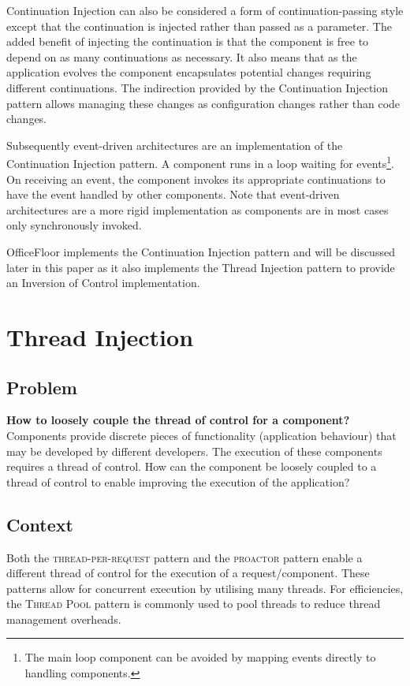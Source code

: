 \documentclass[prodmode]{style/acmlarge}
\begin{document}
Continuation Injection can also be considered a form of continuation-passing
style \cite{continuations} except that the continuation is injected rather than
passed as a parameter.  The added benefit of injecting the continuation is that
the component is free to depend on as many continuations as necessary.  It also
means that as the application evolves the component encapsulates potential
changes requiring different continuations.  The indirection provided by the
Continuation Injection pattern allows managing these changes as configuration
changes rather than code changes.

Subsequently event-driven architectures are an implementation of the
Continuation Injection pattern.  A component runs in a loop waiting for
events\footnote{The main loop component can be avoided by mapping events
directly to handling components.}.  On receiving an event, the component invokes
its appropriate continuations to have the event handled by other components. 
Note that event-driven architectures are a more rigid implementation as
components are in most cases only synchronously invoked.

OfficeFloor \cite{officefloor} implements the Continuation Injection pattern and
will be discussed later in this paper as it also implements the Thread Injection
pattern to provide an Inversion of Control implementation.



\section{Thread Injection}


\subsection{Problem}

\textbf{How to loosely couple the thread of control for a component?} 
Components provide discrete pieces of functionality (application behaviour) that
may be developed by different developers.  The execution of these components
requires a thread of control.  How can the component be loosely coupled to a
thread of control to enable improving the execution of the application?


\subsection{Context}

Both the \textsc{thread-per-request} pattern \cite{thread-per-request} and the
\textsc{proactor} pattern \cite{proactor} enable a different thread of control
for the execution of a request/component.  These patterns allow for concurrent
execution by utilising many threads.  For efficiencies, the \textsc{Thread Pool}
pattern \cite{thread-per-request} is commonly used to pool threads to reduce
thread management overheads.
\end{document}

